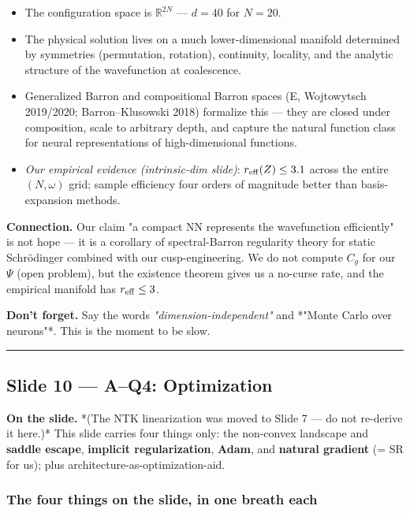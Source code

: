 \documentclass[11pt]{article}
\begin{document}
\begin{itemize}
\item The configuration space is $\mathbb R^{2N}$ --- $d = 40$ for $N = 20$.
\item The physical solution lives on a much lower-dimensional manifold
determined by symmetries (permutation, rotation), continuity, locality,
and the analytic structure of the wavefunction at coalescence.
\item Generalized Barron and compositional Barron spaces (E, Wojtowytsch
2019/2020; Barron--Klusowski 2018) formalize this --- they are closed under
composition, scale to arbitrary depth, and capture the natural function
class for neural representations of high-dimensional functions.
\item \emph{Our empirical evidence (intrinsic-dim slide)}: $r_{\rm eff}(Z) \le 3.1$
across the entire $(N, \omega)$ grid; sample efficiency four orders of
magnitude better than basis-expansion methods.
\end{itemize}
\textbf{Connection.} Our claim "a compact NN represents the wavefunction
efficiently" is not hope --- it is a corollary of spectral-Barron regularity
theory for static Schr\"odinger combined with our cusp-engineering. We do
not compute $C_g$ for our $\Psi$ (open problem), but the existence theorem
gives us a no-curse rate, and the empirical manifold has $r_{\rm eff} \le
3$.

\textbf{Don't forget.} Say the words \emph{"dimension-independent"} and *"Monte Carlo
over neurons"*. This is the moment to be slow.

\vspace{4pt}\hrule\vspace{8pt}

\subsection*{Slide 10 --- A--Q4: Optimization}

\textbf{On the slide.} *(The NTK linearization was moved to Slide 7 --- do not
re-derive it here.)* This slide carries four things only: the non-convex
landscape and \textbf{saddle escape}, \textbf{implicit regularization}, \textbf{Adam}, and
\textbf{natural gradient} (= SR for us); plus architecture-as-optimization-aid.

\subsubsection*{The four things on the slide, in one breath each}
\end{document}
